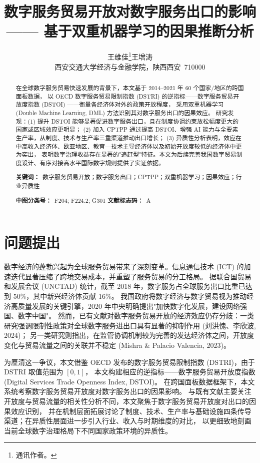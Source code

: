 \documentclass[11pt,a4paper]{article}
\title{数字服务贸易开放对数字服务出口的影响 \\
  \large —— 基于双重机器学习的因果推断分析}
\author{王维佳\thanks{通讯作者。}\quad 王增涛 \\
  \small 西安交通大学经济与金融学院，陕西西安~710000}
\date{}
\begin{document}
\maketitle

\begin{abstract}
\noindent 在全球数字服务贸易快速发展的背景下，本文基于 2014--2021 年 60 个国家/地区的跨国面板数据，
以 OECD 数字服务贸易限制指数 (DSTRI) 的逆指标——数字服务贸易开放度指数 (DSTOI) ——衡量各经济体对外的政策开放程度，
采用双重机器学习 (Double Machine Learning, DML) 方法识别其对数字服务出口的因果效应。
研究发现：(1) 提升 DSTOI 能够显著促进数字服务出口，且在制度协调约束放松幅度更大的国家或区域效应更明显；
(2) 加入 CPTPP 通过提高 DSTOI、增强 AI 能力与全要素生产率，从制度、技术与生产率三重渠道推动出口增长；
(3) 异质性分析表明，效应在中高收入经济体、欧亚地区、教育—技术主导经济体以及初始开放度较低的经济体中更为突出，
表明数字治理收益存在显著的"追赶型"特征。本文为后续完善我国数字贸易制度设计、有序对接高水平国际数字规则提供了实证依据。
\medskip

\noindent\textbf{关键词：}~数字服务贸易开放；数字服务出口；CPTPP；双重机器学习；因果效应；行业异质性
\par\medskip
\noindent\textbf{中图分类号：}~F204; F224.2; G301 \quad \textbf{文献标志码：}~A
\end{abstract}

\section{问题提出}

数字经济的蓬勃兴起为全球服务贸易带来了深刻变革。信息通信技术 (ICT) 的加速迭代显著压缩了跨境交易成本，并重塑了服务贸易的分工格局。
据联合国贸易和发展会议 (UNCTAD) 统计，截至 2018 年，数字服务占全球服务出口比重已达到 50\%，其中新兴经济体贡献 16\%。
我国政府将数字经济与数字贸易视为推动经济高质量发展的关键引擎，2020 年中央明确提出"加快数字化发展，建设网络强国、数字中国"。
然而，已有文献对数字服务贸易开放的经济效应仍存分歧：一类研究强调限制性政策对全球数字服务进出口具有显著的抑制作用 (刘洪愧、李欣波, 2024)；
另一类研究则指出，在监管协调机制较为完善的发达经济体之间，开放度变化与贸易流量之间的关联并不稳定 (Mishra \& Palacio Valencia, 2023)。

为厘清这一争议，本文借鉴 OECD 发布的数字服务贸易限制指数 (DSTRI)，由于 DSTRI 取值范围为 $[0,1]$，
本文构建相应的逆指标——数字服务贸易开放度指数 (Digital Services Trade Openness Index, DSTOI)。
在跨国面板数据框架下，本文系统考察数字服务贸易开放度对数字服务出口的因果影响。
与既有文献主要关注开放度与贸易流量的相关性分析不同，本文聚焦于数字服务贸易开放度对出口的因果效应识别，
并在机制层面拓展讨论了制度、技术、生产率与基础设施四条传导渠道；在异质性层面进一步引入行业、收入与时期维度的对比，
以更细致地刻画当前全球数字治理格局下不同国家政策环境的异质性。
\end{document}
